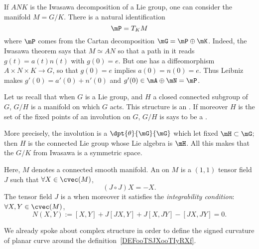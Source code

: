 If $ANK$ is the Iwasawa decomposition of a Lie group, one can consider the manifold $M=G/K$. There is a natural identification
\[
	\mP=T_KM
\]
where $\mP$ comes from the Cartan decomposition $\mG=\mP\oplus\mK$. Indeed, the Iwasawa theorem says that $M\simeq AN$ so that a path in it reads $g(t)=a(t)n(t)$ with $g(0)=e$. But one has a diffeomorphism $A\times N\times K\to G$, so that $g(0)=e$ implies $a(0)=n(0)=e$. Thus Leibniz makes $g'(0)=a'(0)+n'(0)$ and $g'(0)\in\mA\oplus\mN=\mP$.

Let us recall that when $G$ is a Lie group, and $H$ a closed connected subgroup of $G$, $G/H$ is a manifold on which $G$ acts. This structure is an . If moreover $H$ is the set of the fixed points of an involution on $G$, $G/H$ is says to be a .

More precisely, the involution is a $\dpt{\theta}{\mG}{\mG}$ which let fixed $\mH\subset\mG$; then $H$ is the connected Lie group whose Lie algebra is $\mH$. All this makes that the $G/K$ from Iwasawa is a symmetric space.

\begin{definition}  \label{DefCLtjFtD}
	Here, $M$ denotes a connected smooth manifold. An  on $M$ is a $(1,1)$ tensor field $J$ such that $\forall X\in\cvec(M)$,
	\begin{equation}
		(J\circ J)X=-X.
	\end{equation}
	The tensor field $J$ is a  when moreover it satisfies the \emph{integrability condition}: $\forall X,Y\in\cvec(M)$,
	\begin{equation}  \label{DefComplStruct}
		N(X,Y):=[X,Y]+J[JX,Y]+J[X,JY]-[JX,JY]=0.
	\end{equation}
\end{definition}
We already spoke about complex structure in order to define the signed curvature of planar curve around the definition~\ref{DEFooTSJXooTIyRXf}.

